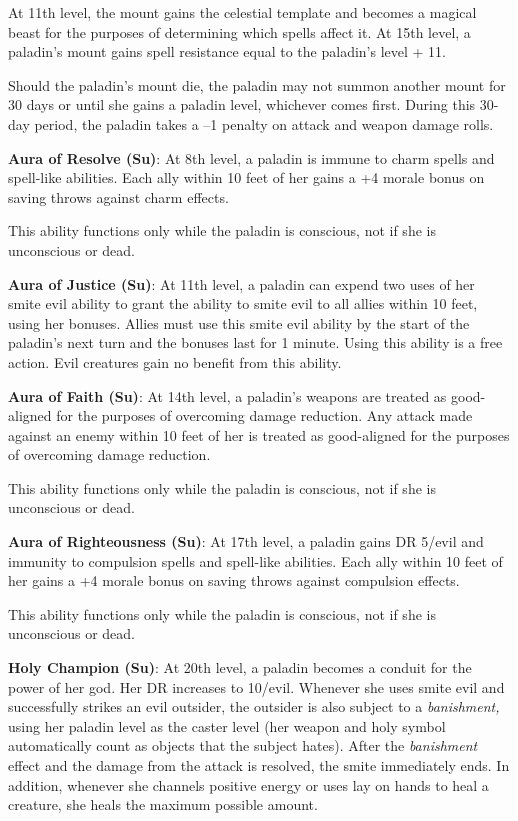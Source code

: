 At 11th level, the mount gains the celestial template and becomes a magical beast for the purposes of determining which spells affect it. At 15th level, a paladin's mount gains spell resistance equal to the paladin's level + 11.
				
Should the paladin's mount die, the paladin may not summon another mount for 30 days or until she gains a paladin level, whichever comes first. During this 30-day period, the paladin takes a --1 penalty on attack and weapon damage rolls. 
				
\textbf{Aura of Resolve (Su)}: At 8th level, a paladin is immune to charm spells and spell-like abilities. Each ally within 10 feet of her gains a +4 morale bonus on saving throws against charm effects.
				
This ability functions only while the paladin is conscious, not if she is unconscious or dead.
				
\textbf{Aura of Justice (Su)}: At 11th level, a paladin can expend two uses of her smite evil ability to grant the ability to smite evil to all allies within 10 feet, using her bonuses. Allies must use this smite evil ability by the start of the paladin's next turn and the bonuses last for 1 minute. Using this ability is a free action. Evil creatures gain no benefit from this ability. 
				
\textbf{Aura of Faith (Su)}: At 14th level, a paladin's weapons are treated as good-aligned for the purposes of overcoming damage reduction. Any attack made against an enemy within 10 feet of her is treated as good-aligned for the purposes of overcoming damage reduction.
				
This ability functions only while the paladin is conscious, not if she is unconscious or dead.
				
\textbf{Aura of Righteousness (Su)}: At 17th level, a paladin gains DR 5/evil and immunity to compulsion spells and spell-like abilities. Each ally within 10 feet of her gains a +4 morale bonus on saving throws against compulsion effects. 
				
This ability functions only while the paladin is conscious, not if she is unconscious or dead.
				
\textbf{Holy Champion (Su)}: At 20th level, a paladin becomes a conduit for the power of her god. Her DR increases to 10/evil. Whenever she uses smite evil and successfully strikes an evil outsider, the outsider is also subject to a \textit{banishment,} using her paladin level as the caster level (her weapon and holy symbol automatically count as objects that the subject hates). After the \textit{banishment} effect and the damage from the attack is resolved, the smite immediately ends. In addition, whenever she channels positive energy or uses lay on hands to heal a creature, she heals the maximum possible amount.
				
